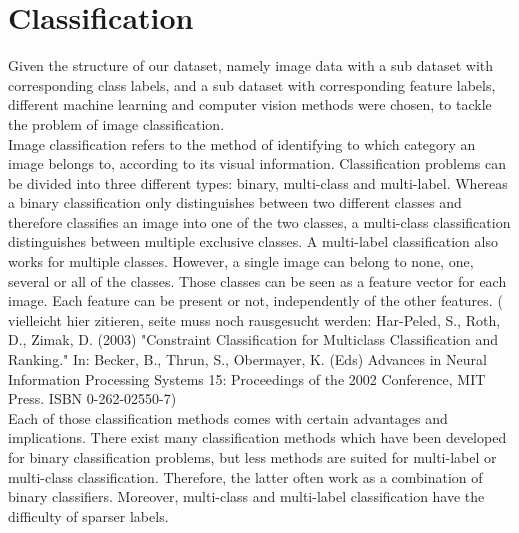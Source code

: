 %
\section{Classification}

Given the structure of our dataset, namely image data with a sub dataset with corresponding class labels, and a sub dataset with corresponding feature labels, different machine learning and computer vision methods were chosen, to tackle the problem of image classification. \\

Image classification refers to the method of identifying to which category an image belongs to, according to its visual information.  Classification problems can be divided into three different types: binary, multi-class and multi-label. Whereas a binary classification only distinguishes between two different classes and therefore classifies an image into one of the two classes, a multi-class classification distinguishes between multiple exclusive classes. A multi-label classification also works for multiple classes. However, a single image can belong to none, one, several or all of the classes. Those classes can be seen as a feature vector for each image. Each feature can be present or not, independently of the other features. ( vielleicht hier zitieren, seite muss noch rausgesucht werden: Har-Peled, S., Roth, D., Zimak, D. (2003) "Constraint Classification for Multiclass Classification and Ranking." In: Becker, B., Thrun, S., Obermayer, K. (Eds) Advances in Neural Information Processing Systems 15: Proceedings of the 2002 Conference, MIT Press. ISBN 0-262-02550-7) \\

Each of those classification methods comes with certain advantages and implications.
There exist many classification methods which have been developed for binary classification problems, but less methods are suited for multi-label or multi-class classification. Therefore, the latter often work as a combination of binary classifiers. Moreover, multi-class and multi-label classification have the difficulty of sparser labels. \\

